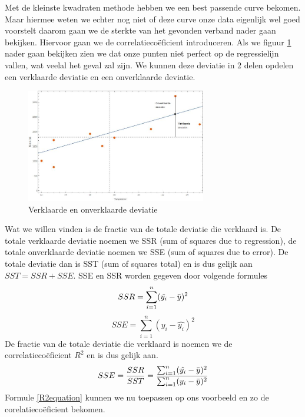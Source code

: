 \documentclass[11pt]{report}
\newcommand{\overbar}[1]{\mkern 1.5mu\overline{\mkern-1.5mu#1\mkern-1.5mu}\mkern 1.5mu}
\newcommand{\pbr}{\hfill\break\hfill\break}
\newcommand{\lbr}{\hfill\break}
\begin{document}
Met de kleinste kwadraten methode hebben we een best passende curve bekomen. Maar hiermee weten we echter nog niet of deze curve onze data eigenlijk wel goed voorstelt daarom gaan we de sterkte van het gevonden verband nader gaan bekijken. Hiervoor gaan we de correlatiecoëficient introduceren.
\pbr
Als we figuur \ref{regressionAveragesPlot} nader gaan bekijken zien we dat onze punten niet perfect op de regressielijn vallen, wat veelal het geval zal zijn. We kunnen deze deviatie in 2 delen opdelen een verklaarde deviatie en een onverklaarde deviatie.
\begin{figure}[H]
  \centering
  \includegraphics[width=0.7\textwidth]{RegressieCafeExplainedUnexplainedDeviations.jpg}
  \caption{Verklaarde en onverklaarde deviatie}
  \label{regressionAveragesPlot}
\end{figure}
Wat we willen vinden is de fractie van de totale deviatie die verklaard is. De totale verklaarde deviatie noemen we SSR (sum of squares due to regression), de totale onverklaarde deviatie noemen we SSE (sum of squares due to error). De totale deviatie dan is SST (sum of squares total) en is dus gelijk aan $SST = SSR + SSE$. SSE en SSR worden gegeven door volgende formules\lbr
\begin{equation}
  SSR = \sum_{i=1}^n(\hat{y_i} - \overbar{y})^2
  \label{SSRequation}
\end{equation}
\begin{equation}
  SSE = \sum_{i=1}^n(y_i - \hat{y_i})^2
  \label{SSEequation}
\end{equation}
De fractie van de totale deviatie die verklaard is noemen we de correlatiecoëficient $R^2$ en is dus gelijk aan.
\begin{equation}
  SSE = \frac{SSR}{SST} = \frac{\sum_{i=1}^n(\hat{y_i} - \overbar{y})^2}{\sum_{i=1}^n(y_i - \overbar{y})^2}
  \label{R2equation}
\end{equation}
Formule \ref{R2equation} kunnen we nu toepassen op ons voorbeeld en zo de corelatiecoëficient bekomen.
\end{document}
